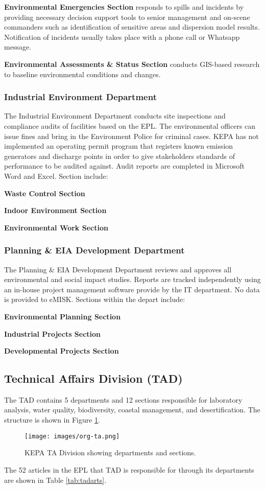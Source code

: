 \textbf{Environmental Emergencies Section} responds to spills and incidents by providing necessary decision support tools to senior management and on-scene commanders such as identification of sensitive areas and dispersion model results. Notification of incidents usually takes place with a phone call or Whatsapp message.

\textbf{Environmental Assessments \& Status Section} conducts GIS-based research to baseline environmental conditions and changes.

\subsubsection{Industrial Environment Department}

The Industrial Environment Department conducts site inspections and compliance audits of facilities based on the EPL. The environmental officers can issue fines and bring in the Environment Police for criminal cases. KEPA has not implemented an operating permit program that registers known emission generators and discharge points in order to give stakeholders standards of performance to be audited against. Audit reports are completed in Microsoft Word and Excel. Section include:

\textbf{Waste Control Section}

\textbf{Indoor Environment Section}

\textbf{Environmental Work Section}

\subsubsection{Planning \&  EIA Development Department}

The Planning \& EIA Development Department reviews and approves all environmental and social impact studies. Reports are tracked independently using an in-house project management software provide by the IT department. No data is provided to eMISK. Sections within the depart include:

\textbf{ Environmental Planning Section}

\textbf{Industrial Projects Section}

\textbf{Developmental Projects Section}

\subsection{Technical Affairs Division (TAD)}
The TAD contains 5 departments and 12 sections  responsible for laboratory analysis, water quality, biodiversity, coastal management, and desertification.  The structure is shown in  Figure \ref{fig:taorg}.
%
\begin{figure}[!htpb]
\centering
\texttt{[image: images/org-ta.png]} 
\caption{KEPA TA Division showing departments and sections.}
\label{fig:taorg}
\end{figure}
%
The 52 articles in the EPL that TAD is responsible for through its departments are shown in Table \ref{tab:tadarts}.

